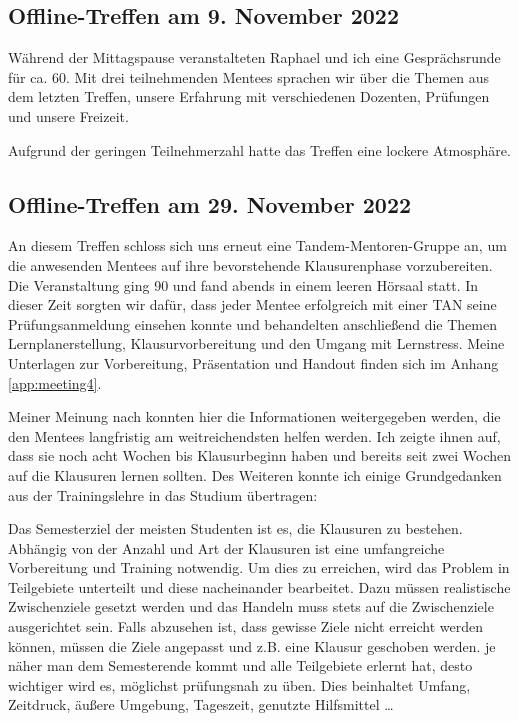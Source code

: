 \documentclass[
    paper=a4,
    div=calc,
    numbers=noendperiod,
]{scrartcl}
\begin{document}
    \subsection{Offline-Treffen am 9. November 2022}
        Während der Mittagspause veranstalteten Raphael und ich eine Gesprächsrunde für ca. \SI{60}{\min}. Mit drei teilnehmenden Mentees sprachen wir über die Themen aus dem letzten Treffen, unsere Erfahrung mit verschiedenen Dozenten, Prüfungen und unsere Freizeit.
        
        Aufgrund der geringen Teilnehmerzahl hatte das Treffen eine lockere Atmosphäre.

    \subsection{Offline-Treffen am 29. November 2022}
        An diesem Treffen schloss sich uns erneut eine Tandem-Mentoren-Gruppe an, um die anwesenden Mentees auf ihre bevorstehende Klausurenphase vorzubereiten. Die Veranstaltung ging \SI{90}{\min} und fand abends in einem leeren Hörsaal statt. In dieser Zeit sorgten wir dafür, dass jeder Mentee erfolgreich mit einer TAN seine Prüfungsanmeldung einsehen konnte und behandelten anschließend die Themen Lernplanerstellung, Klausurvorbereitung und den Umgang mit Lernstress. Meine Unterlagen zur Vorbereitung, Präsentation und Handout finden sich im Anhang \ref{app:meeting4}.

        Meiner Meinung nach konnten hier die Informationen weitergegeben werden, die den Mentees langfristig am weitreichendsten helfen werden. Ich zeigte ihnen auf, dass sie noch acht Wochen bis Klausurbeginn haben und bereits seit zwei Wochen auf die Klausuren lernen sollten. Des Weiteren konnte ich einige Grundgedanken aus der Trainingslehre in das Studium übertragen: 
        
        Das Semesterziel der meisten Studenten ist es, die Klausuren zu bestehen. Abhängig von der Anzahl und Art der Klausuren ist eine umfangreiche Vorbereitung und Training notwendig. Um dies zu erreichen, wird das Problem in Teilgebiete unterteilt und diese nacheinander bearbeitet. Dazu müssen realistische Zwischenziele gesetzt werden und das Handeln muss stets auf die Zwischenziele ausgerichtet sein. Falls abzusehen ist, dass gewisse Ziele nicht erreicht werden können, müssen die Ziele angepasst und z.B. eine Klausur geschoben werden. je näher man dem Semesterende kommt und alle Teilgebiete erlernt hat, desto wichtiger wird es, möglichst prüfungsnah zu üben. Dies beinhaltet Umfang, Zeitdruck, äußere Umgebung, Tageszeit, genutzte Hilfsmittel \dots
\end{document}
